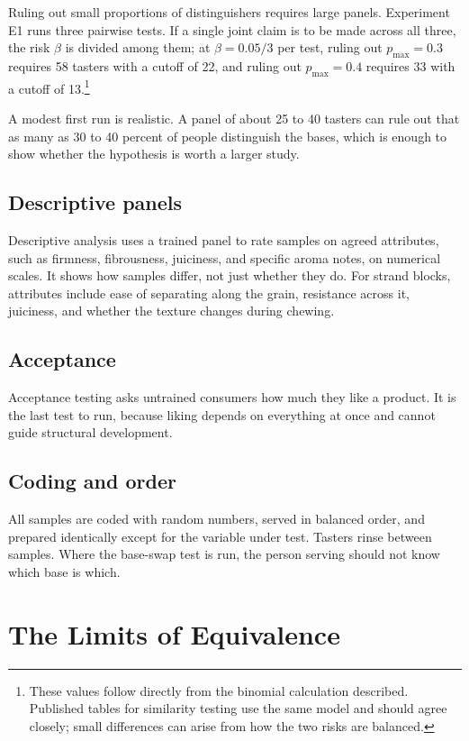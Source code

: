 \documentclass[11pt,openany]{book}
\theoremstyle{definition}
\begin{document}
Ruling out small proportions of distinguishers requires large panels. Experiment E1 runs three pairwise tests. If a single joint claim is to be made across all three, the risk $\beta$ is divided among them; at $\beta = 0.05/3$ per test, ruling out $p_{\max} = 0.3$ requires 58 tasters with a cutoff of 22, and ruling out $p_{\max} = 0.4$ requires 33 with a cutoff of 13.\footnote{These values follow directly from the binomial calculation described. Published tables for similarity testing use the same model and should agree closely; small differences can arise from how the two risks are balanced.}

A modest first run is realistic. A panel of about 25 to 40 tasters can rule out that as many as 30 to 40 percent of people distinguish the bases, which is enough to show whether the hypothesis is worth a larger study.

\section{Descriptive panels}

Descriptive analysis uses a trained panel to rate samples on agreed attributes, such as firmness, fibrousness, juiciness, and specific aroma notes, on numerical scales. It shows how samples differ, not just whether they do. For strand blocks, attributes include ease of separating along the grain, resistance across it, juiciness, and whether the texture changes during chewing.

\section{Acceptance}

Acceptance testing asks untrained consumers how much they like a product. It is the last test to run, because liking depends on everything at once and cannot guide structural development.

\section{Coding and order}

All samples are coded with random numbers, served in balanced order, and prepared identically except for the variable under test. Tasters rinse between samples. Where the base-swap test is run, the person serving should not know which base is which.

\chapter{The Limits of Equivalence}\label{ch:equivalence}
\end{document}

